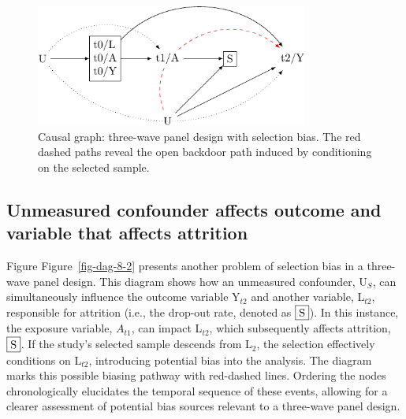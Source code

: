 \documentclass[
  singlecolumn]{report}
\begin{document}
\begin{figure}

{\centering \includegraphics[width=0.8\textwidth,height=\textheight]{causal-dags_files/figure-pdf/fig-dag-8-1.pdf}

}

\caption{\label{fig-dag-8}Causal graph: three-wave panel design with
selection bias. The red dashed paths reveal the open backdoor path
induced by conditioning on the selected sample.}

\end{figure}

\hypertarget{unmeasured-confounder-affects-outcome-and-variable-that-affects-attrition}{%
\subsection{Unmeasured confounder affects outcome and variable that
affects
attrition}\label{unmeasured-confounder-affects-outcome-and-variable-that-affects-attrition}}

Figure Figure~\ref{fig-dag-8-2} presents another problem of selection
bias in a three-wave panel design. This diagram shows how an unmeasured
confounder, U\(_S\), can simultaneously influence the outcome variable
Y\(_{t2}\) and another variable, L\(_{t2}\), responsible for attrition
(i.e., the drop-out rate, denoted as \(\framebox{S}\)). In this
instance, the exposure variable, \(A_{t1}\), can impact L\(_{t2}\),
which subsequently affects attrition, \(\framebox{S}\). If the study's
selected sample descends from L\(_2\), the selection effectively
conditions on L\(_{t2}\), introducing potential bias into the analysis.
The diagram marks this possible biasing pathway with red-dashed lines.
Ordering the nodes chronologically elucidates the temporal sequence of
these events, allowing for a clearer assessment of potential bias
sources relevant to a three-wave panel design.
\end{document}
